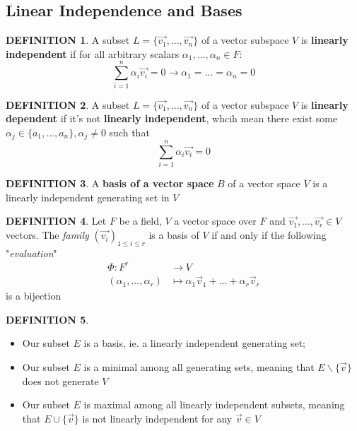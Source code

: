 \documentclass[10pt]{article}
\theoremstyle{definition}
\newtheorem{definition}{DEFINITION}[subsection]
\begin{document}
\subsection{Linear Independence and Bases}
\begin{definition}
    A subset $L = \{\overrightarrow{v_1},...,\overrightarrow{v_n}\}$ of a vector subspace $V$ is \textbf{linearly independent} if for all arbitrary scalars $\alpha_1, ..., \alpha_n \in F$:
    $$\sum_{i=1}^n{\alpha_i\overrightarrow{v_i}} = 0 \rightarrow \alpha_1 = ... = \alpha_n = 0$$
\end{definition}
\begin{definition}
    A subset $L = \{\overrightarrow{v_1},...,\overrightarrow{v_n}\}$ of a vector subspace $V$ is \textbf{linearly dependent} if it's not \textbf{linearly independent}, whcih mean there exist some $\alpha_j \in \{a_1, ..., a_n\}, \alpha_j \neq 0$ such that  $$\sum_{i=1}^n{\alpha_i\overrightarrow{v_i}} = 0$$
\end{definition}
\begin{definition}
    A \textbf{basis of a vector space} $B$ of a vector space $V$ is a linearly independent generating set in $V$
\end{definition}
\begin{definition}
    Let $F$ be a field, $V$ a vector space over $F$ and $\overrightarrow{v_1},...,\overrightarrow{v_r} \in V$ vectors. The \textit{family} $(\overrightarrow{v_i})_{1\leq i\leq r}$ is a basis of $V$ if and only if the following "\textit{evaluation}"
    \[
        \begin{split}
            \Phi : F^r &\rightarrow V\\
            (\alpha_1,...,\alpha_r) &\mapsto \alpha_1\overrightarrow{v}_1 + ... + \alpha_r\overrightarrow{v}_r
        \end{split}
    \]
    is a bijection
\end{definition}
\begin{definition}
    \begin{itemize}
    The following for a subset $E$ of a vector space $V$ are equivalent:An isomorphism of a vector space to itself is called \textbf{anautomorphism} of our vector space.
        \item Our subset $E$ is a basis, ie. a linearly independent generating set;
        \item Our subset $E$ is a minimal among all generating sets, meaning that $E\backslash\{\overrightarrow{v}\}$ does not generate $V$
        \item Our subset $E$ is maximal among all linearly independent subsets, meaning that $E\cup\{\overrightarrow{v}\}$ is not linearly independent for any $\overrightarrow{v} \in V$
    \end{itemize}
\end{definition}
\end{document}
